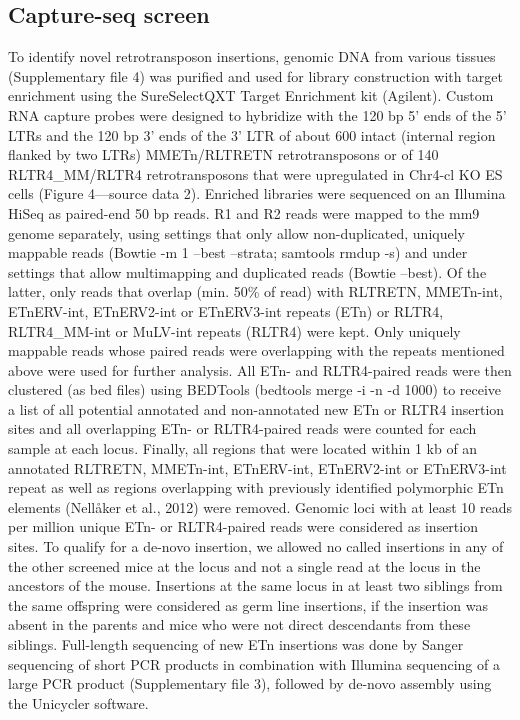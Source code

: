 \documentclass[11pt,a4paper]{article}
\begin{document}
\subsection{Capture-seq screen}

To identify novel retrotransposon insertions, genomic DNA from various tissues (Supplementary file 4) was purified and used for library construction with target enrichment using the SureSelectQXT Target Enrichment kit (Agilent). Custom RNA capture probes were designed to hybridize with the 120 bp 5’ ends of the 5’ LTRs and the 120 bp 3’ ends of the 3’ LTR of about 600 intact (internal region flanked by two LTRs) MMETn/RLTRETN retrotransposons or of 140 RLTR4\_MM/RLTR4 retrotransposons that were upregulated in Chr4-cl KO ES cells (Figure 4—source data 2). Enriched libraries were sequenced on an Illumina HiSeq as paired-end 50 bp reads. R1 and R2 reads were mapped to the mm9 genome separately, using settings that only allow non-duplicated, uniquely mappable reads (Bowtie -m 1 --best --strata; samtools rmdup -s) and under settings that allow multimapping and duplicated reads (Bowtie --best). Of the latter, only reads that overlap (min. 50\% of read) with RLTRETN, MMETn-int, ETnERV-int, ETnERV2-int or ETnERV3-int repeats (ETn) or RLTR4, RLTR4\_MM-int or MuLV-int repeats (RLTR4) were kept. Only uniquely mappable reads whose paired reads were overlapping with the repeats mentioned above were used for further analysis. All ETn- and RLTR4-paired reads were then clustered (as bed files) using BEDTools (bedtools merge -i -n -d 1000) to receive a list of all potential annotated and non-annotated new ETn or RLTR4 insertion sites and all overlapping ETn- or RLTR4-paired reads were counted for each sample at each locus. Finally, all regions that were located within 1 kb of an annotated RLTRETN, MMETn-int, ETnERV-int, ETnERV2-int or ETnERV3-int repeat as well as regions overlapping with previously identified polymorphic ETn elements (Nellåker et al., 2012) were removed. Genomic loci with at least 10 reads per million unique ETn- or RLTR4-paired reads were considered as insertion sites. To qualify for a de-novo insertion, we allowed no called insertions in any of the other screened mice at the locus and not a single read at the locus in the ancestors of the mouse. Insertions at the same locus in at least two siblings from the same offspring were considered as germ line insertions, if the insertion was absent in the parents and mice who were not direct descendants from these siblings. Full-length sequencing of new ETn insertions was done by Sanger sequencing of short PCR products in combination with Illumina sequencing of a large PCR product (Supplementary file 3), followed by de-novo assembly using the Unicycler software.
\end{document}
